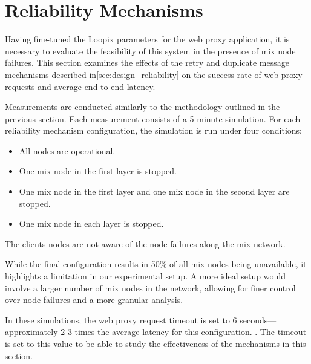 \documentclass[a4paper,11pt,oneside]{report}
\begin{document}

\section{Reliability Mechanisms}
\label{sec:reliabilty}
Having fine-tuned the Loopix parameters for the web proxy application, it is necessary to evaluate the feasibility of this system in the presence of mix node failures. This section examines the effects of the retry and duplicate message mechanisms described in\autoref{sec:design_reliability} on the success rate of web proxy requests and average end-to-end latency.

Measurements are conducted similarly to the methodology outlined in the previous section. Each measurement consists of a 5-minute simulation. For each reliability mechanism configuration, the simulation is run under four conditions:

\begin{itemize}
    \item All nodes are operational.
    \item One mix node in the first layer is stopped.
    \item One mix node in the first layer and one mix node in the second layer are stopped.
    \item One mix node in each layer is stopped.
\end{itemize}

The clients nodes are not aware of the node failures along the mix network.
    
While the final configuration results in 50\% of all mix nodes being unavailable, it highlights a limitation in our experimental setup. A more ideal setup would involve a larger number of mix nodes in the network, allowing for finer control over node failures and a more granular analysis.

In these simulations, the web proxy request timeout is set to 6 seconds—approximately 2-3 times the average latency for this configuration. . The timeout is set to this value to be able to study the effectiveness of the mechanisms in this section.
\end{document}
